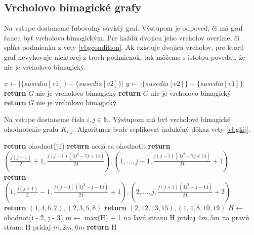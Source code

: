 \subsection{Vrcholovo bimagické grafy}
 
\begin{subalg} Na vstupe dostaneme ľubovoľný súvislý graf. Výstupom je odpoveď, či má graf šancu byť vrcholovo bimagickým. Pre každú dvojicu jeho vrcholov overíme, či spĺňa podmienku z vety \ref{vbgcondition}. Ak existuje dvojica vrcholov, pre ktorú graf nevyhovuje niektorej z troch podmienok, tak môžeme s istotou povedať, že nie je vrcholovo bimagický.
\end{subalg}

\begin{algorithmic}
    \STATE $x \gets |\{susedia[v1]\} - \{susedia[v2]\}|$
    \STATE $y \gets |\{susedia[v2]\} - \{susedia[v1]\}|$
	\STATE \textbf{return} $G$ nie je vrcholovo bimagický
    \ENDIF
	\STATE \textbf{return} $G$ nie je vrcholovo bimagický
    \ENDIF
	\STATE \textbf{return} $G$ nie je vrcholovo bimagický
    \ENDIF
\ENDFOR
\end{algorithmic}


\begin{subalg} Na vstupe dostaneme čísla $i,j \in \mathbb{N}$. Výstupom má byť vrcholové bimagické ohodnotenie grafu $K_{i,j}$. Algoritmus bude replikovať indukčný dôkaz vety \ref{vbgkij}.
\end{subalg}

\begin{algorithmic}
	\STATE \textbf{return} ohodnot(j,i)
\ENDIF
{}
	\STATE \textbf{return} nedá sa ohodnotiť
\ENDIF
{}
	\STATE \textbf{return} $(\frac{j(j-1)}{2} + 1, \frac{j(j-1)(3j^2-7j+14)}{24}), (1, ... , j-1, \frac{j(j-1)(3j^2-7j+14)}{24} + 1)$
\ENDIF
{}
	\STATE \textbf{return} $(1, \frac{j(j+1)}{2} - 1, \frac{j(j+1)(3j^2-j-14)}{24} + 1), (2, ... , j, \frac{j(j+1)(3j^2-j-14)}{24} + 2)$
\ENDIF
{}
	\STATE \textbf{return} $(1, 4, 6, 7), (2, 3, 5, 8)$
\ENDIF
{}
	\STATE \textbf{return} $(2, 12, 13, 15), (1, 4, 8, 10, 19)$
\ENDIF
\STATE $H \gets$ ohodnot(i - 2, j - 3)
\STATE $m \gets$ max(H) + 1
\STATE na ľavú stranu H pridaj $4m, 5m$
\STATE na pravú stranu H pridaj $m, 2m, 6m$
\STATE \textbf{return} H
\end{algorithmic}

